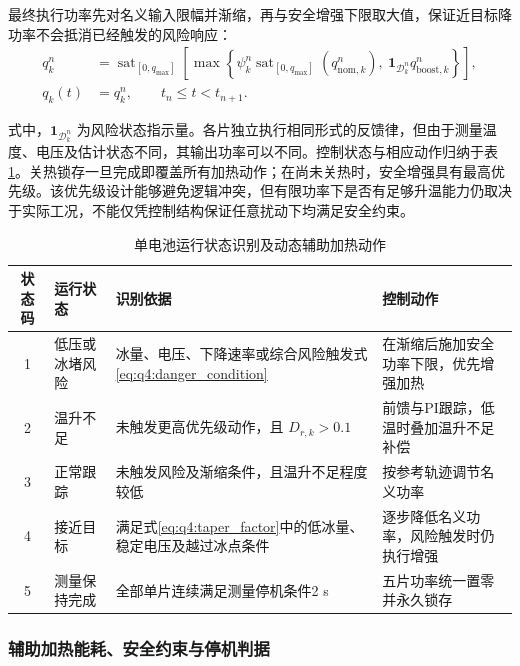 最终执行功率先对名义输入限幅并渐缩，再与安全增强下限取大值，保证近目标降功率不会抵消已经触发的风险响应：
\begin{equation}
\begin{aligned}
q_k^n&=\operatorname{sat}_{[0,q_{\max}]}\!\left[
\max\!\left\{\psi_k^n\operatorname{sat}_{[0,q_{\max}]}(q_{\mathrm{nom},k}^n),
\ \boldsymbol 1_{\mathcal D_k^n}q_{\mathrm{boost},k}^n\right\}\right],
\\
q_k(t)&=q_k^n,\qquad t_n\leq t<t_{n+1}.
\end{aligned}
\tag{7-26}\label{eq:q4:applied_power}
\end{equation}

式中，$\boldsymbol 1_{\mathcal D_k^n}$ 为风险状态指示量。各片独立执行相同形式的反馈律，但由于测量温度、电压及估计状态不同，其输出功率可以不同。控制状态与相应动作归纳于表\ref{tab:q4:states}。关热锁存一旦完成即覆盖所有加热动作；在尚未关热时，安全增强具有最高优先级。该优先级设计能够避免逻辑冲突，但有限功率下是否有足够升温能力仍取决于实际工况，不能仅凭控制结构保证任意扰动下均满足安全约束。

\begin{table}[htbp]
    \centering
    \caption{单电池运行状态识别及动态辅助加热动作}
    \vspace{0.3cm}
    \label{tab:q4:states}
    \renewcommand{\arraystretch}{1.4}
    \small
    \setlength{\tabcolsep}{4pt}
    \begin{tabular}{c p{2.7cm} p{6.0cm} p{4.8cm}}
        \toprule
        \textbf{状态码} & \textbf{运行状态} & \textbf{识别依据} & \textbf{控制动作} \\
        \midrule
        1 & 低压或冰堵风险 & 冰量、电压、下降速率或综合风险触发式\eqref{eq:q4:danger_condition} & 在渐缩后施加安全功率下限，优先增强加热 \\
        2 & 温升不足 & 未触发更高优先级动作，且 $D_{r,k}>0.1$ & 前馈与PI跟踪，低温时叠加温升不足补偿 \\
        3 & 正常跟踪 & 未触发风险及渐缩条件，且温升不足程度较低 & 按参考轨迹调节名义功率 \\
        4 & 接近目标 & 满足式\eqref{eq:q4:taper_factor}中的低冰量、稳定电压及越过冰点条件 & 逐步降低名义功率，风险触发时仍执行增强 \\
        5 & 测量保持完成 & 全部单片连续满足测量停机条件2 s & 五片功率统一置零并永久锁存 \\
        \bottomrule
    \end{tabular}
\end{table}

\subsubsection{辅助加热能耗、安全约束与停机判据}

